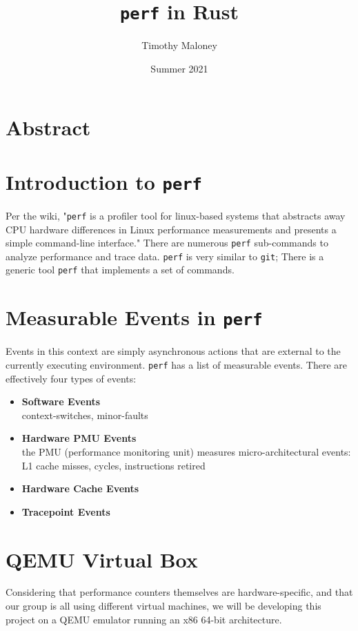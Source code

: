 \documentclass{article}
\title{\texttt{perf} in Rust}
\author{Timothy Maloney}
\date{Summer 2021}
\begin{document}
\maketitle
\section*{Abstract}
\pagebreak
\section{Introduction to \texttt{perf}}
Per the wiki, "\texttt{perf} is a profiler tool for linux-based systems that abstracts away CPU hardware differences in Linux performance measurements and presents a simple command-line interface." There are numerous \texttt{perf} sub-commands to analyze performance and trace data. \texttt{perf} is very similar to \texttt{git}; There is a generic tool \texttt{perf} that
implements a set of commands.
\section{Measurable Events in \texttt{perf}}
Events in this context are simply asynchronous actions that are external to the currently executing environment. \texttt{perf} has a list of measurable events. There are effectively four types of events:
\begin{itemize}
    \item \textbf{Software Events}
    \\ context-switches, minor-faults
    \item \textbf{Hardware PMU Events}
    \\ the PMU (performance monitoring unit) measures micro-architectural events: L1 cache misses, cycles, instructions retired
    \item \textbf{Hardware Cache Events}
    \\ %
    \item \textbf{Tracepoint Events}
    \\ %
\end{itemize}
\section{QEMU Virtual Box}
Considering that performance counters themselves are hardware-specific, and that our group is all using different virtual machines, we will be developing this project on a QEMU emulator running an x86 64-bit architecture.
\end{document}
